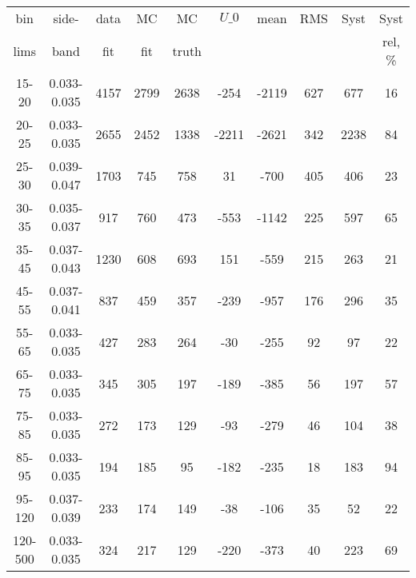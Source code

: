 \documentclass{beamer}
\begin{document}
\begin{frame}
\begin{table}[h]
\begin{center}
  \begin{tabular}{|c|c|c|c|c|c|c|c|c|c|}
    bin & side- & data & MC & MC    & $U\_{0}$ & mean & RMS & Syst & Syst \\ 
    lims & band & fit & fit & truth &       &      &     &      & rel, \% \\ \hline
    15-20 & 0.033-0.035 & 4157 & 2799 & 2638 & -254 & -2119 & 627 & 677 & 16  \\ \hline
    20-25 & 0.033-0.035 & 2655 & 2452 & 1338 & -2211 & -2621 & 342 & 2238 & 84  \\ \hline
    25-30 & 0.039-0.047 & 1703 & 745 & 758 & 31 & -700 & 405 & 406 & 23  \\ \hline
    30-35 & 0.035-0.037 & 917 & 760 & 473 & -553 & -1142 & 225 & 597 & 65  \\ \hline
    35-45 & 0.037-0.043 & 1230 & 608 & 693 & 151 & -559 & 215 & 263 & 21  \\ \hline
    45-55 & 0.037-0.041 & 837 & 459 & 357 & -239 & -957 & 176 & 296 & 35  \\ \hline
    55-65 & 0.033-0.035 & 427 & 283 & 264 & -30 & -255 & 92 & 97 & 22  \\ \hline
    65-75 & 0.033-0.035 & 345 & 305 & 197 & -189 & -385 & 56 & 197 & 57  \\ \hline
    75-85 & 0.033-0.035 & 272 & 173 & 129 & -93 & -279 & 46 & 104 & 38  \\ \hline
    85-95 & 0.033-0.035 & 194 & 185 & 95 & -182 & -235 & 18 & 183 & 94  \\ \hline
    95-120 & 0.037-0.039 & 233 & 174 & 149 & -38 & -106 & 35 & 52 & 22  \\ \hline
    120-500 & 0.033-0.035 & 324 & 217 & 129 & -220 & -373 & 40 & 223 & 69  \\ \hline
  \end{tabular}
  \label{tab:systSbVar_Meth1_ELECTRON_WGamma_Endcap}
  \end{center}
\end{table}
\end{frame}
\end{document}
